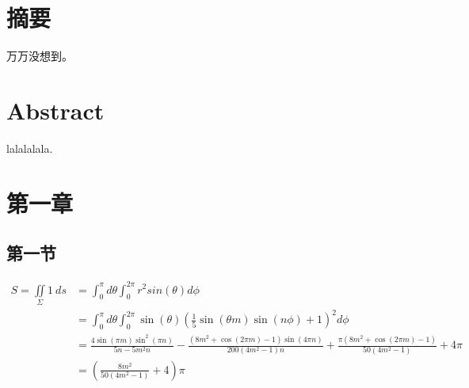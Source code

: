 \documentclass{ctexart}
\newcommand{\xiaosihao}{\fontsize{12pt}\selectfont}
\begin{document}
\pagenumbering{} %
\renewcommand{\headrulewidth}{0pt}%




\clearpage


\xiaosihao
\section*{摘要}

万万没想到。

\section*{Abstract}
lalalalala.


\clearpage
\tableofcontents
\clearpage



\renewcommand{\headrulewidth}{0.4pt} %


\setcounter{page}{1} 


\section{第一章}
\subsection{第一节}

\begin{align*}
S=\iint\limits_{\Sigma}1 \ ds &= \int_0^{\pi}d\theta \int_0^{2\pi} r^2sin(\theta) d\phi \\
&= \int_0^{\pi}d\theta \int_0^{2\pi}\sin (\theta ) \left(\frac{1}{5} \sin (\theta  m) \sin (n \phi )+1\right)^2d\phi\\
&=\frac{4 \sin (\pi  m) \sin ^2(\pi  n)}{5 n-5 m^2 n}-\frac{\left(8 m^2+\cos (2 \pi  m)-1\right) \sin (4 \pi  n)}{200 \left(4 m^2-1\right) n}+\frac{\pi  \left(8 m^2+\cos (2 \pi  m)-1\right)}{50 \left(4 m^2-1\right)}+4 \pi\\
&=  \left(\frac{8 m^2}{50 \left(4 m^2-1\right)}+4\right)\pi
\end{align*}
\end{document}
